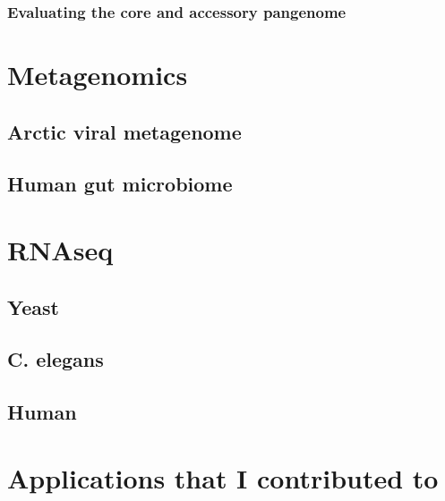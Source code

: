 \subsubsection{Evaluating the core and accessory pangenome}


\section{Metagenomics}

\subsection{Arctic viral metagenome}

\subsection{Human gut microbiome}


\section{RNAseq}

\subsection{Yeast}

\subsection{C. elegans}

\subsection{Human}


\section{Applications that I contributed to}

